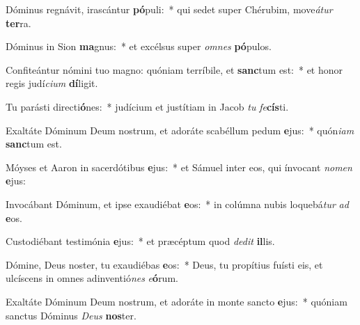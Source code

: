 \item Dóminus regnávit, irascántur \textbf{pó}puli:~* qui sedet super Chérubim, move\textit{á}\textit{tur} \textbf{ter}ra.
\item Dóminus in Sion \textbf{ma}gnus:~* et excélsus super \textit{om}\textit{nes} \textbf{pó}pulos.
\item Confiteántur nómini tuo magno: quóniam terríbile, et \textbf{sanc}tum est:~* et honor regis judí\textit{ci}\textit{um} \textbf{dí}ligit.
\item Tu parásti directi\textbf{ó}nes:~* judícium et justítiam in Jacob \textit{tu} \textit{fe}\textbf{cís}ti.
\item Exaltáte Dóminum Deum nostrum, et adoráte scabéllum pedum \textbf{e}jus:~* quón\textit{i}\textit{am} \textbf{sanc}tum est.
\item Móyses et Aaron in sacerdótibus \textbf{e}jus:~* et Sámuel inter eos, qui ínvocant \textit{no}\textit{men} \textbf{e}jus:
\item Invocábant Dóminum, et ipse exaudiébat \textbf{e}os:~* in colúmna nubis loquebá\textit{tur} \textit{ad} \textbf{e}os.
\item Custodiébant testimónia \textbf{e}jus:~* et præcéptum quod \textit{de}\textit{dit} \textbf{il}lis.
\item Dómine, Deus noster, tu exaudiébas \textbf{e}os:~* Deus, tu propítius fuísti eis, et ulcíscens in omnes adinventió\textit{nes} \textit{e}\textbf{ó}rum.
\item Exaltáte Dóminum Deum nostrum, et adoráte in monte sancto \textbf{e}jus:~* quóniam sanctus Dóminus \textit{De}\textit{us} \textbf{nos}ter.

